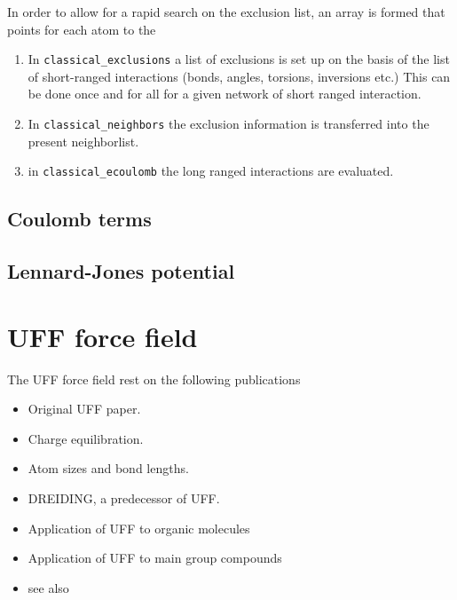 \documentclass[11pt,a4paper]{report}
\begin{document}
In order to allow for a rapid search on the exclusion list, an array
is formed that points for each atom to the 


\begin{enumerate}
\item In \verb|classical_exclusions| a list of exclusions is set up on
  the basis of the list of short-ranged interactions (bonds, angles,
  torsions, inversions etc.) This can be done once and for all for a
  given network of short ranged interaction.
\item In \verb|classical_neighbors| the exclusion information is
  transferred into the present neighborlist.
\item in \verb|classical_ecoulomb| the long ranged interactions are
  evaluated.
\end{enumerate}

\subsection{Coulomb terms}
\subsection{Lennard-Jones potential}



\section{UFF force field}
The UFF force field rest on the following publications
\begin{itemize}
\item Original UFF paper\cite{rappe92_jacs114_10024}.
\item Charge equilibration\cite{rappe91_jpc95_3358}.
\item Atom sizes and bond lengths\cite{okeefe92_jacs113_3226}.
\item DREIDING\cite{mayo90_jpc90_8897}, a predecessor of UFF.
\item Application of UFF to organic molecules\cite{casewit92_jacs114_10035}
\item Application of UFF to main group compounds\cite{casewit92_jacs114_11046}
\item see also\cite{addicoat14_jctc10_880}
\end{itemize}
\end{document}
